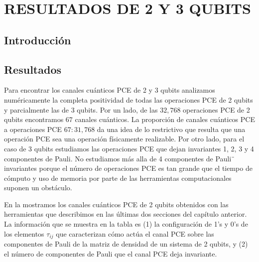 \chapter{RESULTADOS DE 2 Y 3 QUBITS}
\section{Introducción}

\section{Resultados}
\noindent
{}

Para encontrar los canales cuánticos PCE de 2 y 3 qubits analizamos
numéricamente la completa positividad de todas las operaciones PCE de 2
qubits y parcialmente las de 3 qubits. 
Por un lado, de las $32,768$ operaciones PCE de 2 qubits encontramos 
$67$ canales cuánticos. La proporción de canales cuánticos PCE
a operaciones PCE $67:31,768$ da una idea de lo restrictivo 
que resulta que una operación PCE sea una operación físicamente 
realizable. 
Por otro lado, para el caso de 3 qubits 
estudiamos las operaciones PCE que dejan invariantes 1, 2, 3 y 4 
componentes de Pauli. No estudiamos más alla de 4 componentes de 
Pauli¨ 
invariantes porque el número de operaciones PCE es tan grande que 
el tiempo de cómputo y uso de memoria por parte de las herramientas
computacionales suponen un obstáculo. 

\noindent
{}

En la  mostramos los canales cuánticos 
PCE de 2 qubits obtenidos con las herramientas que describimos en las 
últimas dos secciones del capítulo anterior. La información que se muestra
en la tabla es (1) la configuración de 1's y 0's de los elementos
$\tau_{ij}$ que caracterizan cómo actúa el canal PCE sobre las 
componentes de Pauli de la matriz de densidad de un sistema de 
2 qubits, y (2) el número de componentes de Pauli que el canal PCE
deja invariante. 

